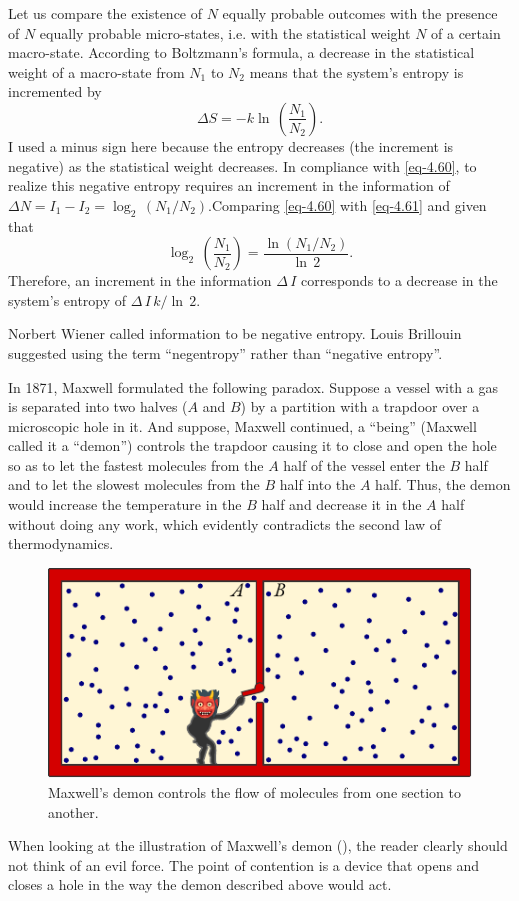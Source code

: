 Let us compare the existence of $N$ equally probable outcomes with the presence of $N$ equally probable micro-states, i.e. with the statistical weight $N$ of a certain macro-state. According to Boltzmann's formula, a decrease in the statistical weight of a macro-state from $N_{1}$ to $ N_{2}$ means that the system's entropy is incremented by
\begin{equation}%
\Delta S = - k  \ln \, \left( \frac{N_{1}}{N_{2}} \right).
\label{eq-4.61}
\end{equation}
I used a minus sign here because the entropy decreases (the increment is negative) as the statistical weight decreases. In compliance with \eqref{eq-4.60}, to realize this negative entropy requires an increment in the information of $\Delta N = I_{1}- I_{2} = \log_{2} \, \left( N_{1}/ N_{2} \right)
$.Comparing \eqref{eq-4.60} with \eqref{eq-4.61} and given that
\begin{equation*}
\log_{2} \, \left( \frac{N_{1}}{N_{2}} \right) = \frac{\ln \left( N_{1}/ N_{2} \right) }{\ln \, 2}.
\end{equation*}
Therefore, an increment in the information $\Delta \, I$ corresponds to a decrease in the system's entropy of $\Delta \, I \, k / \ln \, 2$.

Norbert Wiener called information to be negative entropy. Louis Brillouin suggested using the term ``negentropy'' rather than ``negative entropy''.

 In 1871, Maxwell formulated the following paradox. Suppose a vessel with a gas is separated into two halves ($A$ and $B$) by a partition with a trapdoor over a microscopic hole in it. And suppose, Maxwell continued, a ``being'' (Maxwell called it a ``demon'') controls the trapdoor causing it to close and open the hole so as to let the fastest molecules from the $A$ half of the vessel enter the $B$ half and to let the slowest molecules from the $B$ half into the $A$ half. Thus, the demon would increase the temperature in the $B$ half and decrease it in the $A$ half without doing any work, which evidently contradicts the second law of thermodynamics.
\begin{figure}[!ht]
 \centering
 \includegraphics[width=0.9\tfwidth]{figures/maxwell-demon.pdf}
\caption{Maxwell's demon controls the flow of molecules from one section to another.\label{max-demon}}
 \end{figure}
When looking at the illustration of Maxwell's demon (), the reader clearly should not think of an evil force. The point of contention is a device that opens and closes a hole in the way the demon described above would act.


